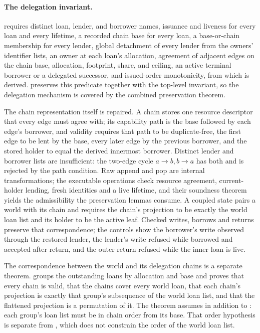 \documentclass[a4paper,UKenglish,cleveref]{lipics-v2021}
\begin{document}
\paragraph*{The delegation invariant.}
 requires distinct loan, lender, and borrower names, issuance
and liveness for every loan and every lifetime, a recorded chain base for every
loan, a base-or-chain membership for every lender, global detachment of every
lender from the owners' identifier lists, an owner at each loan's allocation,
agreement of adjacent edges on the chain base, allocation, footprint, share, and
ceiling, an active terminal borrower or a delegated successor, and issued-order
monotonicity, from which  is derived.
 preserves this predicate together with the
top-level invariant, so the delegation mechanism is covered by the combined
preservation theorem.

The chain representation itself is repaired. A chain stores one resource
descriptor that every edge must agree with; its capability path is the base
followed by each edge's borrower, and validity requires that path to be
duplicate-free, the first edge to be lent by the base, every later edge by the
previous borrower, and the stored holder to equal the derived innermost
borrower. Distinct lender and borrower lists are insufficient: the two-edge cycle
$a\to b, b\to a$ has both and is rejected by the path condition. Raw append and
pop are internal transformations; the executable operations check resource
agreement, current-holder lending, fresh identities and a live lifetime, and
their soundness theorem yields the admissibility the preservation lemmas
consume. A coupled state pairs a world with its chain and requires the chain's
projection to be exactly the world loan list and its holder to be the active
leaf. Checked writes, borrows and returns preserve that correspondence; the
controls show the borrower's write observed through the restored lender, the
lender's write refused while borrowed and accepted after return, and the outer
return refused while the inner loan is live.

The correspondence between the world and its delegation chains is a separate
theorem.  groups the outstanding loans by
allocation and base and proves that every chain is valid, that the chains cover
every world loan, that each chain's projection is exactly that group's
subsequence of the world loan list, and that the flattened projection is a
permutation of it. The theorem assumes  in addition
to : each group's loan list must be in chain order from its base.
That order hypothesis is separate from , which does not constrain
the order of the world loan list.
\end{document}
